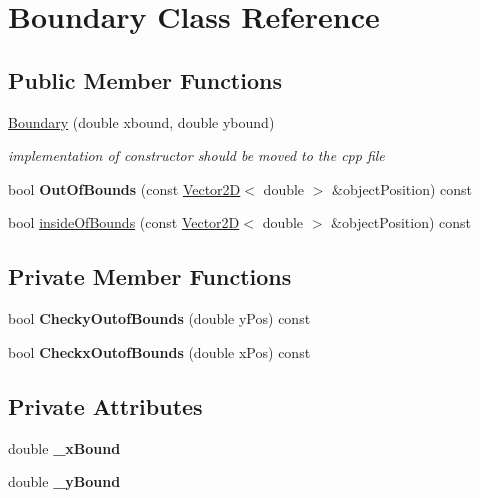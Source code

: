 \hypertarget{class_boundary}{}\section{Boundary Class Reference}
\label{class_boundary}
\subsection*{Public Member Functions}
\begin{DoxyCompactItemize}
\item 
\mbox{\label{class_boundary_a1ebdbcf1f4bfc6c98ec89e0f15754a59}} 
\hyperlink{class_boundary_a1ebdbcf1f4bfc6c98ec89e0f15754a59}{Boundary} (double xbound, double ybound)
\begin{DoxyCompactList}\small\item\em implementation of constructor should be moved to the cpp file \end{DoxyCompactList}\item 
\mbox{\label{class_boundary_a9c6a5bbcb06d977512fb871f1ab86f5b}} 
bool {\bfseries Out\+Of\+Bounds} (const \hyperlink{class_vector2_d}{Vector2D}$<$ double $>$ \&object\+Position) const
\item 
bool \hyperlink{class_boundary_aeb7b795c19f8ad23d8509444a33d473c}{inside\+Of\+Bounds} (const \hyperlink{class_vector2_d}{Vector2D}$<$ double $>$ \&object\+Position) const
\end{DoxyCompactItemize}
\subsection*{Private Member Functions}
\begin{DoxyCompactItemize}
\item 
\mbox{\label{class_boundary_a5063de08946b8303ddeff4c2b72e202e}} 
bool {\bfseries Checky\+Outof\+Bounds} (double y\+Pos) const
\item 
\mbox{\label{class_boundary_a10d2d43b80364ce04cb22b90c9b54493}} 
bool {\bfseries Checkx\+Outof\+Bounds} (double x\+Pos) const
\end{DoxyCompactItemize}
\subsection*{Private Attributes}
\begin{DoxyCompactItemize}
\item 
\mbox{\label{class_boundary_a55685a68cc9b709898bdbe632d2dfeec}} 
double {\bfseries \+\_\+x\+Bound}
\item 
\mbox{\label{class_boundary_a709e9e1f24faec6d4a35b50e6faffb8e}} 
double {\bfseries \+\_\+y\+Bound}
\end{DoxyCompactItemize}


